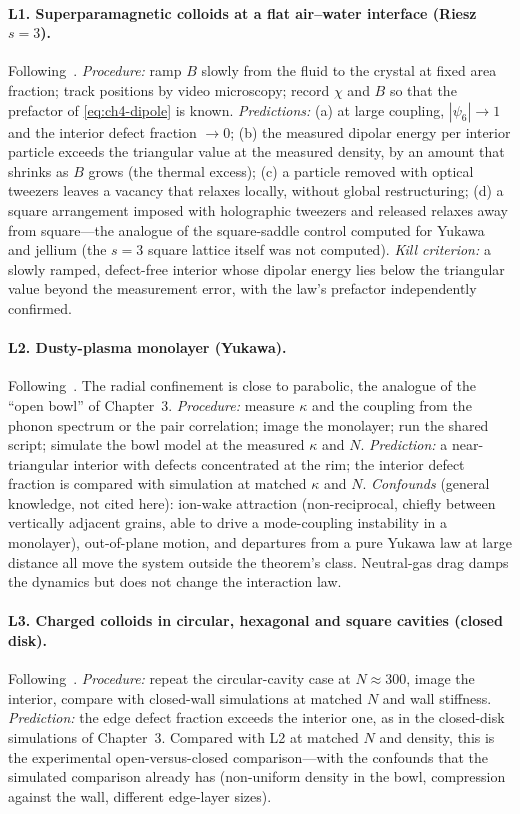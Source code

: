 \paragraph{L1. Superparamagnetic colloids at a flat air--water interface (Riesz $s=3$).} Following~\cite{zahn}.
\emph{Procedure:} ramp $B$ slowly from the fluid to the crystal at fixed area fraction; track positions by video
microscopy; record $\chi$ and $B$ so that the prefactor of \eqref{eq:ch4-dipole} is known. \emph{Predictions:}
(a) at large coupling, $|\psi_6|\to1$ and the interior defect fraction $\to0$; (b) the measured dipolar energy per
interior particle exceeds the triangular value at the measured density, by an amount that shrinks as $B$ grows
(the thermal excess); (c) a particle removed with optical tweezers leaves a vacancy that relaxes locally, without
global restructuring; (d) a square arrangement imposed with holographic tweezers and released relaxes away from
square---the analogue of the square-saddle control computed for Yukawa and jellium (the $s=3$ square lattice itself
was not computed). \emph{Kill criterion:} a slowly ramped, defect-free interior whose dipolar energy lies below the
triangular value beyond the measurement error, with the law's prefactor independently confirmed.

\paragraph{L2. Dusty-plasma monolayer (Yukawa).} Following~\cite{thomas}. The radial confinement is close to
parabolic, the analogue of the ``open bowl'' of Chapter~3. \emph{Procedure:} measure $\kappa$ and the coupling from
the phonon spectrum or the pair correlation; image the monolayer; run the shared script; simulate the bowl model at
the measured $\kappa$ and $N$. \emph{Prediction:} a near-triangular interior with defects concentrated at the rim;
the interior defect fraction is compared with simulation at matched $\kappa$ and $N$. \emph{Confounds} \tierC{} (general knowledge, not cited here): ion-wake
attraction (non-reciprocal, chiefly between vertically adjacent grains, able to drive a mode-coupling instability
in a monolayer), out-of-plane motion, and departures from a pure Yukawa law at large distance all move the system
outside the theorem's class. Neutral-gas drag damps the dynamics but does not change the interaction law.

\paragraph{L3. Charged colloids in circular, hexagonal and square cavities (closed disk).} Following~\cite{bubeck}.
\emph{Procedure:} repeat the circular-cavity case at $N\approx300$, image the interior, compare with closed-wall
simulations at matched $N$ and wall stiffness. \emph{Prediction:} the edge defect fraction exceeds the interior one,
as in the closed-disk simulations of Chapter~3. Compared with L2 at matched $N$ and density, this is the
experimental open-versus-closed comparison---with the confounds that the simulated comparison already has
(non-uniform density in the bowl, compression against the wall, different edge-layer sizes).

